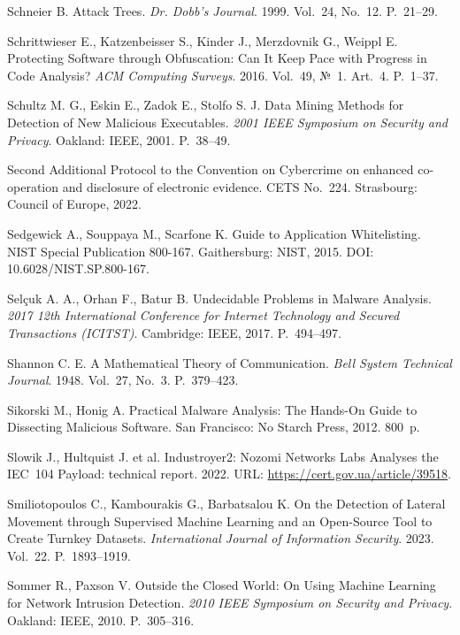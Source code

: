  Schneier B. Attack Trees. \emph{Dr. Dobb's Journal}. 1999. Vol.~24, No.~12. P.~21--29.

 Schrittwieser E., Katzenbeisser S., Kinder J., Merzdovnik G., Weippl E. Protecting Software through Obfuscation: Can It Keep Pace with Progress in Code Analysis? \emph{ACM Computing Surveys}. 2016. Vol.~49, №~1. Art.~4. P.~1--37.

 Schultz M. G., Eskin E., Zadok E., Stolfo S. J. Data Mining Methods for Detection of New Malicious Executables. \emph{2001 IEEE Symposium on Security and Privacy}. Oakland: IEEE, 2001. P.~38--49.

 Second Additional Protocol to the Convention on Cybercrime on enhanced co-operation and disclosure of electronic evidence. CETS No.~224. Strasbourg: Council of Europe, 2022.

 Sedgewick A., Souppaya M., Scarfone K. Guide to Application Whitelisting. NIST Special Publication 800-167. Gaithersburg: NIST, 2015. DOI: 10.6028/NIST.SP.800-167.

 Selçuk A. A., Orhan F., Batur B. Undecidable Problems in Malware Analysis. \emph{2017 12th International Conference for Internet Technology and Secured Transactions (ICITST)}. Cambridge: IEEE, 2017. P.~494--497.

 Shannon C. E. A Mathematical Theory of Communication. \emph{Bell System Technical Journal}. 1948. Vol.~27, No.~3. P.~379--423.

 Sikorski M., Honig A. Practical Malware Analysis: The Hands-On Guide to Dissecting Malicious Software. San Francisco: No Starch Press, 2012. 800~p.

 Slowik J., Hultquist J. et al. Industroyer2: Nozomi Networks Labs Analyses the IEC~104 Payload: technical report. 2022. URL: \url{https://cert.gov.ua/article/39518}.

 Smiliotopoulos C., Kambourakis G., Barbatsalou K. On the Detection of Lateral Movement through Supervised Machine Learning and an Open-Source Tool to Create Turnkey Datasets. \emph{International Journal of Information Security}. 2023. Vol.~22. P.~1893--1919.

 Sommer R., Paxson V. Outside the Closed World: On Using Machine Learning for Network Intrusion Detection. \emph{2010 IEEE Symposium on Security and Privacy}. Oakland: IEEE, 2010. P.~305--316.

